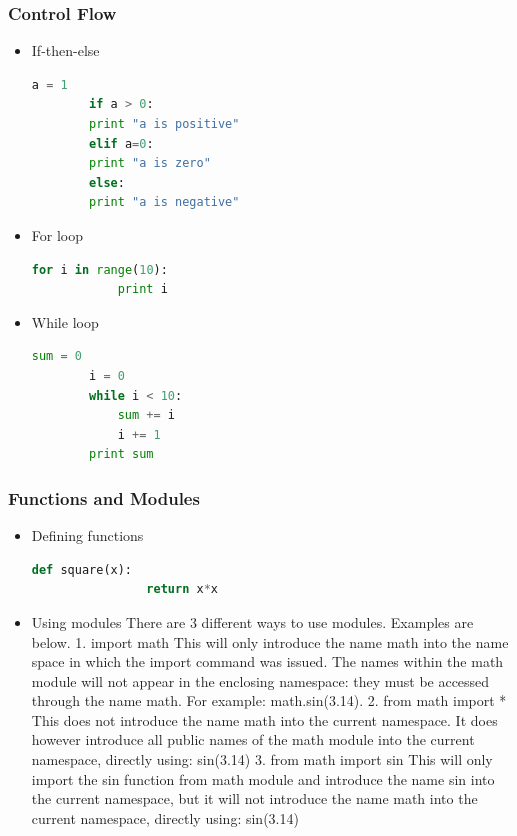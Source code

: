 
\begin{frame}
  \MyLogo
  \frametitle{Control Flow}  
\small

\begin{itemize}
	\item If-then-else
	\begin{lstlisting}[language=python]
		a = 1
		if a > 0:
		print "a is positive"
		elif a=0:
		print "a is zero"
		else:
		print "a is negative"
	\end{lstlisting}
			
	\item For loop
	\begin{lstlisting}[language=python]
		for i in range(10):
			print i
	\end{lstlisting}	
		
	\item While loop
	\begin{lstlisting}[language=python]
		sum = 0
		i = 0
		while i < 10:
			sum += i
			i += 1
		print sum
	\end{lstlisting}
		
\end{itemize}

\end{frame}


\begin{frame}
  \MyLogo
  \frametitle{Functions and Modules}  
\small

\begin{itemize}
	\item Defining functions
		\begin{lstlisting}[language=python]
			def square(x):
				return x*x
		\end{lstlisting}
	\item Using modules
			There are 3 different ways to use modules. Examples are below.
			1. import math
				This will only introduce the name math into the name space in which the import command was issued. The names within the math module will not appear in the enclosing namespace: they must be accessed through the name math. For example: math.sin(3.14).
			2. from math import *
				This does not introduce the name math into the current namespace. It does however introduce all public names of the math module into the current namespace, directly using: sin(3.14)
			3. from math import sin
				This will only import the sin function from math module and introduce the name sin into the current namespace, but it will not introduce the name math into the current namespace, directly using: sin(3.14)
		
\end{itemize}

\end{frame}
